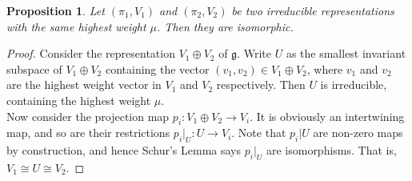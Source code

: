 \documentclass[11pt]{book}
\newtheorem{proposition}[theorem]{Proposition}
\newcommand{\mf}[1]{\mathfrak{#1}}
\begin{document}
\begin{proposition}
Let $(\pi_1,V_1)$ and $(\pi_2, V_2)$ be two irreducible representations with the same highest weight $\mu$. Then they are isomorphic.
\end{proposition}
\begin{proof}
Consider the representation $V_1 \oplus V_2$ of $\mf{g}$. Write $U$ as the smallest invariant subspace of $V_1 \oplus V_2$ containing the vector $(v_1,v_2) \in V_1 \oplus V_2$, where $v_1$ and $v_2$ are the highest weight vector in $V_1$ and $V_2$ respectively. Then $U$ is irreducible, containing the highest weight $\mu$.\\
Now consider the projection map $p_i: V_1 \oplus V_2 \to V_i$. It is obviously an intertwining map, and so are their restrictions $p_i  \Big|_U: U \to V_i$. Note that $p_i|U$ are non-zero maps by construction, and hence Schur's Lemma says $p_i  \Big|_U$ are isomorphisms. That is, $V_1 \cong U \cong V_2$.
\end{proof}
\end{document}
